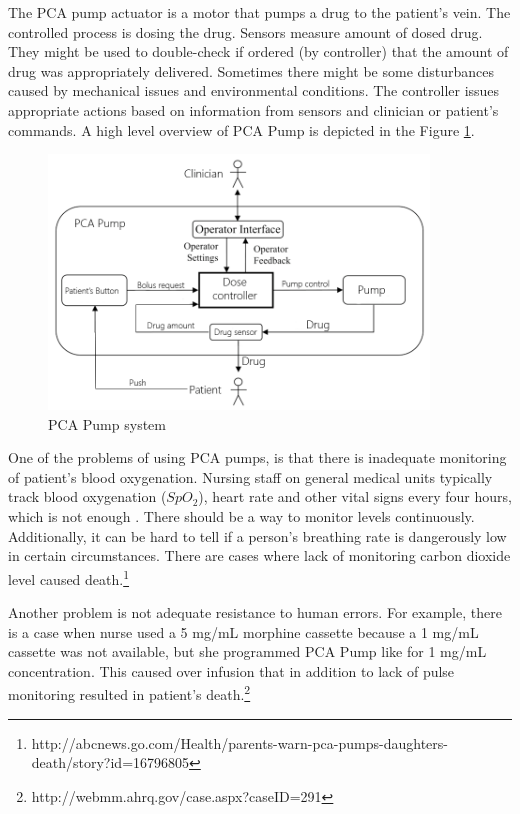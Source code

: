 The PCA pump actuator is a motor that pumps a drug to the patient's vein. The controlled process is dosing the drug. Sensors measure amount of dosed drug. They might be used to double-check if ordered (by controller) that the amount of drug was appropriately delivered. Sometimes there might be some disturbances caused by mechanical issues and environmental conditions. The controller issues appropriate actions based on information from sensors and clinician or patient's commands. A high level overview of PCA Pump is depicted in the Figure \ref{figure:pca-pump-system}.

\begin{figure}[ht]%
    \begin{center}
    	\includegraphics[width=0.9\textwidth]{figures/pca-pump-system.png}    	
    \end{center}
    \caption{PCA Pump system}
    \label{figure:pca-pump-system}
\end{figure}

One of the problems of using PCA pumps, is that there is inadequate monitoring of patient's blood oxygenation. Nursing staff on general medical units typically track blood oxygenation ($SpO_2$), heart rate and other vital signs every four hours, which is not enough \cite{RespiratoryDepression:Article}. There should be a way to monitor levels continuously. Additionally, it can be hard to tell if a person's breathing rate is dangerously low in certain circumstances. There are cases where lack of monitoring carbon dioxide level caused death.\footnote{http://abcnews.go.com/Health/parents-warn-pca-pumps-daughters-death/story?id=16796805} 

Another problem is not adequate resistance to human errors. For example, there is a case when nurse used a 5 mg/mL morphine cassette because a 1 mg/mL cassette was not available, but she programmed PCA Pump like for 1 mg/mL concentration. This caused over infusion that in addition to lack of pulse monitoring resulted in  patient's death.\footnote{http://webmm.ahrq.gov/case.aspx?caseID=291}

